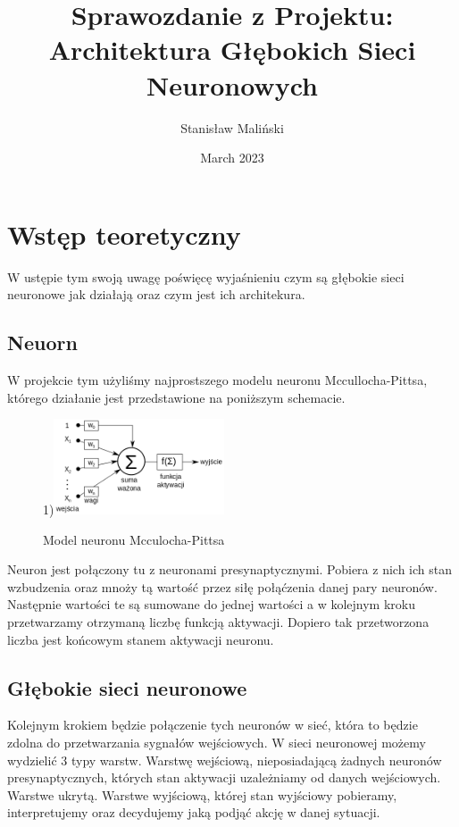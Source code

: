 \documentclass{article}
\title{Sprawozdanie z Projektu: \\ Architektura Głębokich Sieci Neuronowych}
\author{Stanisław Maliński}
\date{March 2023}
\begin{document}
\maketitle

\section{Wstęp teoretyczny}

W ustępie tym swoją uwagę poświęcę wyjaśnieniu czym są głębokie sieci neuronowe jak działają oraz czym jest ich architekura.\\
\subsection{Neuorn}
W projekcie tym użyliśmy najprostszego modelu neuronu Mccullocha-Pittsa, którego działanie jest przedstawione na poniższym schemacie.

\begin{figure}[htb]
\begin{center}
1)\includegraphics[angle=0, width=0.45\textwidth]{Model Neuronu.png}
\caption{Model neuronu Mcculocha-Pittsa \cite{MC-P-wiki}}
\end{center}
\end{figure}

Neuron jest połączony tu z neuronami presynaptycznymi. Pobiera z nich ich stan wzbudzenia oraz mnoży tą wartość przez siłę połąćzenia danej pary neuronów. Następnie wartości te są sumowane do jednej wartości a w kolejnym kroku przetwarzamy otrzymaną liczbę funkcją aktywacji. Dopiero tak przetworzona liczba jest końcowym stanem aktywacji neuronu.


\subsection{Głębokie sieci neuronowe}
Kolejnym krokiem będzie połączenie tych neuronów w sieć, która to będzie zdolna do przetwarzania sygnałów wejściowych. W sieci neuronowej możemy wydzielić 3 typy warstw. Warstwę wejściową, nieposiadającą żadnych neuronów presynaptycznych, których stan aktywacji uzależniamy od danych wejściowych. Warstwe ukrytą. Warstwe wyjściową, której stan wyjściowy pobieramy, interpretujemy oraz decydujemy jaką podjąć akcję w danej sytuacji.
\end{document}

